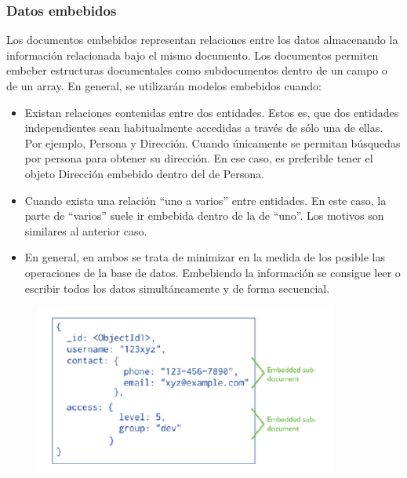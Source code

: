 \documentclass[preprint,12pt]{elsarticle}
\begin{document}
\subsubsection{\textbf{Datos embebidos}}
Los documentos embebidos representan relaciones entre los datos almacenando la información relacionada bajo el mismo documento. Los documentos permiten embeber estructuras documentales como subdocumentos dentro de un campo o de un array.
En general, se utilizarán modelos embebidos cuando:
\begin{itemize}

\item Existan relaciones contenidas entre dos entidades. Estos es, que dos entidades independientes sean habitualmente accedidas a través de sólo una de ellas. Por ejemplo, Persona y Dirección. Cuando únicamente se permitan búsquedas por persona para obtener su dirección. En ese caso, es preferible tener el objeto Dirección embebido dentro del de Persona.
\item Cuando exista una relación “uno a varios” entre entidades. En este caso, la parte de “varios” suele ir embebida dentro de la de “uno”. Los motivos son similares al anterior caso.
\item En general, en ambos se trata de minimizar en la medida de los posible las operaciones de la base de datos. Embebiendo la información se consigue leer o escribir todos los datos simultáneamente y de forma secuencial.
\end{itemize}
 \cite{MongoDB}
\begin{figure}[htb]
	\begin{center}
		\includegraphics[width=10cm]{./IMAGENES/img03.png} %
	\end{center}
\end{figure}





\end{document}
